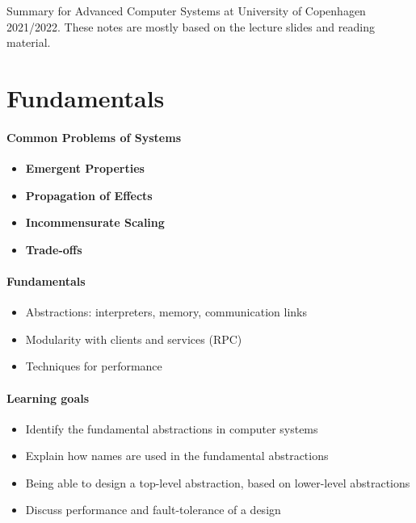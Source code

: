 Summary for Advanced Computer Systems
at University of Copenhagen 2021/2022.
These notes are mostly based on the lecture slides and
reading material.

\section{Fundamentals}
\paragraph{Common Problems of Systems}
\begin{itemize}
\item \textbf{Emergent Properties}
  
\item \textbf{Propagation of Effects} \\

\item \textbf{Incommensurate Scaling} \\

\item \textbf{Trade-offs} \\
  
  
\end{itemize}

\paragraph{Fundamentals}
\begin{itemize}
\item Abstractions: interpreters, memory, communication links
\item Modularity with clients and services (RPC)
\item Techniques for performance
\end{itemize}

\paragraph{Learning goals}
\begin{itemize}
\item Identify the fundamental abstractions in
  computer systems
\item Explain how names are used in the fundamental abstractions
\item Being able to design a top-level abstraction, based on
  lower-level abstractions
\item Discuss performance and fault-tolerance of a design
\end{itemize}

